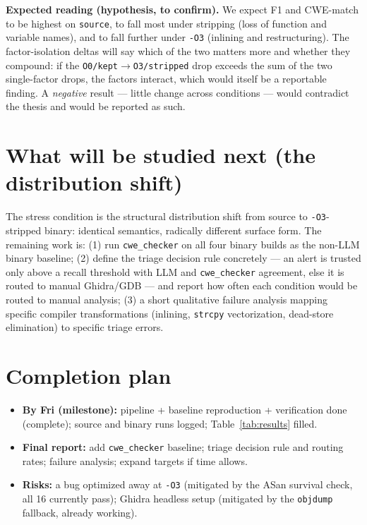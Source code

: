\documentclass[10pt]{article}
\begin{document}
\textbf{Expected reading (hypothesis, to confirm).} We expect F1 and CWE-match to
be highest on \texttt{source}, to fall most under stripping (loss of function and
variable names), and to fall further under \texttt{-O3} (inlining and
restructuring). The factor-isolation deltas will say which of the two matters
more and whether they compound: if the \texttt{O0/kept}$\to$\texttt{O3/stripped}
drop exceeds the sum of the two single-factor drops, the factors interact, which
would itself be a reportable finding. A \emph{negative} result --- little change
across conditions --- would contradict the thesis and would be reported as such.

\section{What will be studied next (the distribution shift)}
The stress condition is the structural distribution shift from source to
\texttt{-O3}-stripped binary: identical semantics, radically different surface
form. The remaining work is: (1) run \texttt{cwe\_checker} on all four binary
builds as the non-LLM binary baseline; (2) define the triage decision rule
concretely --- an alert is trusted only above a recall threshold with LLM and
\texttt{cwe\_checker} agreement, else it is routed to manual Ghidra/GDB --- and
report how often each condition would be routed to manual analysis; (3) a short
qualitative failure analysis mapping specific compiler transformations (inlining,
\texttt{strcpy} vectorization, dead-store elimination) to specific triage errors.

\section{Completion plan}
\begin{itemize}
\item \textbf{By Fri (milestone):} pipeline + baseline reproduction + verification
done (complete); source and binary runs logged; Table~\ref{tab:results} filled.
\item \textbf{Final report:} add \texttt{cwe\_checker} baseline; triage decision
rule and routing rates; failure analysis; expand targets if time allows.
\item \textbf{Risks:} a bug optimized away at \texttt{-O3} (mitigated by the ASan
survival check, all 16 currently pass); Ghidra headless setup (mitigated by the
\texttt{objdump} fallback, already working).
\end{itemize}
\end{document}
